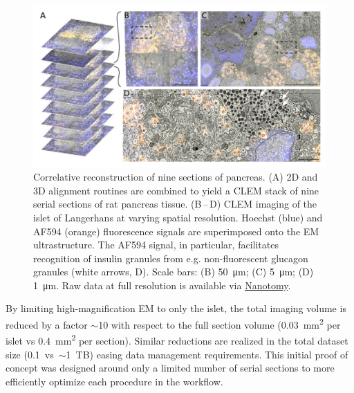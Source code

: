 \begin{figure}[!tb]
    \centering
    \includegraphics[width=\linewidth]{chapter-3/figures_PDF/fig3-5_rat.pdf}
    \caption{Correlative reconstruction of nine sections of pancreas.
    (A) 2D and 3D alignment routines are combined to yield a CLEM stack of nine serial sections of rat pancreas tissue.
    (B\,--\,D) CLEM imaging of the islet of Langerhans at varying spatial resolution. Hoechst (blue) and AF594 (orange) fluorescence signals are superimposed onto the EM ultrastructure. The AF594 signal, in particular, facilitates recognition of insulin granules from e.g. non-fluorescent glucagon granules (white arrows, D).
    Scale bars: (B) \SI{50}{\micro\meter}; (C) \SI{5}{\micro\meter}; (D) \SI{1}{\micro\meter}.
    Raw data at full resolution is available via \href{www.nanotomy.org}{Nanotomy}.}
    \label{fig:3.5_ratpancreas}
\end{figure}

By limiting high-magnification EM to only the islet, the total imaging volume is reduced by a factor ${\sim}$10 with respect to the full section volume (\SI{0.03}{\milli\meter^2} per islet vs \SI{0.4}{\milli\meter^2} per section). Similar reductions are realized in the total dataset size (0.1\, vs \,${\sim}$\SI{1}{TB}) easing data management requirements. This initial proof of concept was designed around only a limited number of serial sections to more efficiently optimize each procedure in the workflow.


